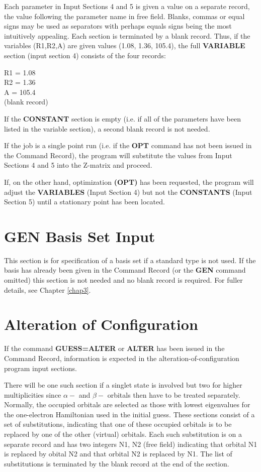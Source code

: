 Each parameter in Input Sections 4 and 5 is given a value on a
separate record, the value following the parameter name in free field.
Blanks, commas or equal signs may be used as separators with
perhaps equals signs being the most intuitively appealing. Each section is
terminated by a blank record. Thus, if the variables (R1,R2,A) are given
values (1.08, 1.36, 105.4), the full {\bf VARIABLE} section (input section 4)
consists of the four records:
\begin{center}
R1 = 1.08 \\
R2 = 1.36 \\
A  = 105.4 \\
(blank record) \\
\end{center}
If the {\bf CONSTANT} section is empty (i.e. if all of the parameters have
been listed in the variable section), a second blank record is not
needed.

If the job is a single point run (i.e. if the {\bf OPT} command has not
been issued in the Command Record), the program will substitute the
values from Input Sections 4 and 5 into the Z-matrix and proceed. 

If, on
the other hand, optimization {\bf (OPT)} has been requested, the program will
adjust the {\bf VARIABLES} (Input Section 4) but not the {\bf CONSTANTS} 
(Input Section 5) until a stationary point has been located.
\section{\sf GEN Basis Set Input}
This section is for specification of a basis set if a standard type
is not used. If the basis has already been given in 
the Command Record (or the {\bf GEN} command omitted)
this section is not needed and no blank record is required. For fuller
details, see Chapter \ref{chap3}.
\section{\sf Alteration of Configuration}
If the command {\bf GUESS=ALTER} or {\bf ALTER} has been issued in the
Command Record, information is expected in the
alteration-of-configuration program input sections. 

There will be one
such section if a singlet state is involved but two for higher
multiplicities since $\alpha-$ and $\beta-$ orbitals then have to be treated
separately.  Normally, the occupied orbitals are selected as those with
lowest eigenvalues for the one-electron Hamiltonian used in the initial
guess.  These sections consist of a set of substitutions, indicating
that one of these occupied orbitals is to be replaced by one of the
other (virtual) orbitals. Each such substitution is on a separate record
and has two integers N1, N2 (free field) indicating that orbital N1 is
replaced by obital N2 and that orbital N2 is replaced by N1. The list
of substitutions is terminated by the blank record at the end of the
section.

